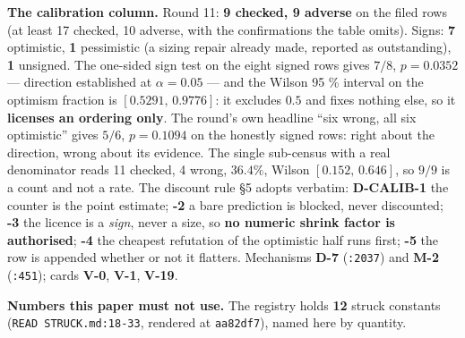 \documentclass[11pt,a4paper]{article}
\theoremstyle{plain}
\theoremstyle{definition}
\theoremstyle{remark}
\begin{document}
\textbf{The calibration column.} Round 11: \textbf{9 checked, 9 adverse}
on the filed rows (at least 17 checked, 10 adverse, with the
confirmations the table omits). Signs: \textbf{7} optimistic, \textbf{1}
pessimistic (a sizing repair already made, reported as outstanding),
\textbf{1} unsigned. The one-sided sign test on the eight signed rows
gives \(7/8\), \(p=0.0352\) --- direction established at \(\alpha=0.05\)
--- and the Wilson 95 \% interval on the optimism fraction is
\([0.5291,\,0.9776]\): it excludes \(0.5\) and fixes nothing else, so it
\textbf{licenses an ordering only}. The round's own headline ``six
wrong, all six optimistic'' gives \(5/6\), \(p=0.1094\) on the honestly
signed rows: right about the direction, wrong about its evidence. The
single sub-census with a real denominator reads 11 checked, 4 wrong,
\(36.4\%\), Wilson \([0.152,\,0.646]\), so \(9/9\) is a count and not a
rate. The discount rule §5 adopts verbatim: \textbf{D-CALIB-1} the
counter is the point estimate; \textbf{-2} a bare prediction is blocked,
never discounted; \textbf{-3} the licence is a \emph{sign}, never a
size, so \textbf{no numeric shrink factor is authorised}; \textbf{-4}
the cheapest refutation of the optimistic half runs first; \textbf{-5}
the row is appended whether or not it flatters. Mechanisms \textbf{D-7}
(\texttt{:2037}) and \textbf{M-2} (\texttt{:451}); cards \textbf{V-0},
\textbf{V-1}, \textbf{V-19}.

\textbf{Numbers this paper must not use.} The registry holds \textbf{12}
struck constants (\texttt{READ\ STRUCK.md:18-33}, rendered at
\texttt{aa82df7}), named here by quantity.
\end{document}
